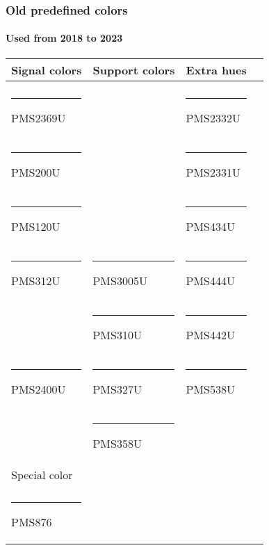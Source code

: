 \documentclass[american,aspectratio=169]{beamer}
\begin{document}
\begin{frame}
\frametitle{Old predefined colors}
\framesubtitle{Used from 2018 to 2023}
\centering

\begin{tabular}{llll}
  Signal colors                             & Support colors                            & Extra hues                                 \\
  \hline                                                                                                                               \\
  {\color{PMS2369U}\rule{4em}{2ex}} PMS2369U &                                            & {\color{PMS2332U}\rule{4em}{2ex}} PMS2332U \\
  {\color{PMS200U}\rule{4em}{2ex}} PMS200U   &                                            & {\color{PMS2331U}\rule{4em}{2ex}} PMS2331U \\
  {\color{PMS120U}\rule{4em}{2ex}} PMS120U   &                                            & {\color{PMS434U}\rule{4em}{2ex}} PMS434U   \\
  {\color{PMS312U}\rule{4em}{2ex}} PMS312U   & {\color{PMS3005U}\rule{4em}{2ex}} PMS3005U & {\color{PMS444U}\rule{4em}{2ex}} PMS444U   \\
                                             & {\color{PMS310U}\rule{4em}{2ex}} PMS310U   & {\color{PMS442U}\rule{4em}{2ex}} PMS442U   \\
  {\color{PMS2400U}\rule{4em}{2ex}} PMS2400U & {\color{PMS327U}\rule{4em}{2ex}} PMS327U   & {\color{PMS538U}\rule{4em}{2ex}} PMS538U   \\
                                             & {\color{PMS358U}\rule{4em}{2ex}} PMS358U   &                                            \\
  Special color                             &                                            &                                            \\
  \hline                                                                                                                               \\
  {\color{PMS876}\rule{4em}{2ex}} PMS876     &                                            &
\end{tabular}

\end{frame}

\begin{frame}[allowframebreaks]
	\frametitle{\refname}
	\printbibliography[heading=none,title=none]
\end{frame}
\end{document}
